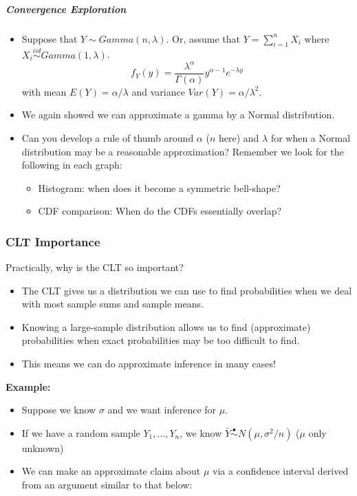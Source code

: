 \documentclass[
]{article}
\providecommand{\tightlist}{%
  \setlength{\itemsep}{0pt}\setlength{\parskip}{0pt}}
\begin{document}
\hypertarget{convergence-exploration}{%
\subparagraph{Convergence Exploration}\label{convergence-exploration}}

\begin{itemize}
\tightlist
\item
  Suppose that \(Y \sim Gamma(n, \lambda)\). Or, assume that
  \(Y = \sum_{i=1}^{n} X_i\) where
  \(X_i\stackrel{iid}\sim Gamma(1, \lambda)\).
  \[f_Y(y) = \frac{\lambda^\alpha}{\Gamma(\alpha)}y^{\alpha -1}e^{-\lambda y}\]
  with mean \(E(Y) = \alpha/\lambda\) and variance
  \(Var(Y) = \alpha/\lambda^2\).
\item
  We again showed we can approximate a gamma by a Normal distribution.\\
\item
  Can you develop a rule of thumb around \(\alpha\) (\(n\) here) and
  \(\lambda\) for when a Normal distribution may be a reasonable
  approximation? Remember we look for the following in each graph:

  \begin{itemize}
  \tightlist
  \item
    Histogram: when does it become a symmetric bell-shape?
  \item
    CDF comparison: When do the CDFs essentially overlap?
  \end{itemize}
\end{itemize}

\hypertarget{clt-importance}{%
\subsubsection{CLT Importance}\label{clt-importance}}

Practically, why is the CLT so important?

\begin{itemize}
\tightlist
\item
  The CLT gives us a distribution we can use to find probabilities when
  we deal with most sample sums and sample means.
\item
  Knowing a large-sample distribution allows us to find (approximate)
  probabilities when exact probabilities may be too difficult to find.
\item
  This means we can do approximate inference in many cases!
\end{itemize}

\textbf{Example:}

\begin{itemize}
\tightlist
\item
  Suppose we know \(\sigma\) and we want inference for \(\mu\).
\item
  If we have a random sample \(Y_1,...,Y_n\), we know
  \(\bar{Y}\stackrel{\bullet}{\sim}N(\mu,\sigma^2/n)\) (\(\mu\) only
  unknown)
\item
  We can make an approximate claim about \(\mu\) via a confidence
  interval derived from an argument similar to that below:
\end{itemize}
\end{document}
